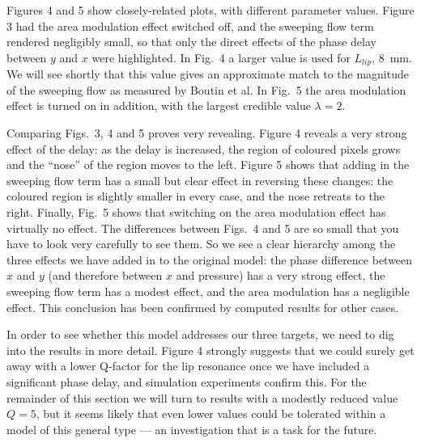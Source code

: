   Figures 4 and 5 show closely-related plots, with different parameter values. 
  Figure 3 had the area modulation effect switched off, and the sweeping flow 
  term rendered negligibly small, so that only the direct effects of the phase 
  delay between $y$ and $x$ were highlighted. In Fig.\ 4 a larger value is used 
  for $L_{lip}$, 8~mm. We will see shortly that this value gives an approximate 
  match to the magnitude of the sweeping flow as measured by Boutin et al. In 
  Fig.\ 5 the area modulation effect is turned on in addition, with the largest 
  credible value $\lambda =2$. 



  Comparing Figs.\ 3, 4 and 5 proves very revealing. Figure 4 reveals a very 
  strong effect of the delay: as the delay is increased, the region of coloured 
  pixels grows and the ``nose'' of the region moves to the left. Figure 5 shows 
  that adding in the sweeping flow term has a small but clear effect in 
  reversing these changes: the coloured region is slightly smaller in every 
  case, and the nose retreats to the right. Finally, Fig.\ 5 shows that 
  switching on the area modulation effect has virtually no effect. The 
  differences between Figs.\ 4 and 5 are so small that you have to look very 
  carefully to see them. So we see a clear hierarchy among the three effects we 
  have added in to the original model: the phase difference between $x$ and $y$ 
  (and therefore between $x$ and pressure) has a very strong effect, the 
  sweeping flow term has a modest effect, and the area modulation has a 
  negligible effect. This conclusion has been confirmed by computed results for 
  other cases. 

  In order to see whether this model addresses our three targets, we need to 
  dig into the results in more detail. Figure 4 strongly suggests that we could 
  surely get away with a lower Q-factor for the lip resonance once we have 
  included a significant phase delay, and simulation experiments confirm this. 
  For the remainder of this section we will turn to results with a modestly 
  reduced value $Q=5$, but it seems likely that even lower values could be 
  tolerated within a model of this general type --- an investigation that is a 
  task for the future. 

